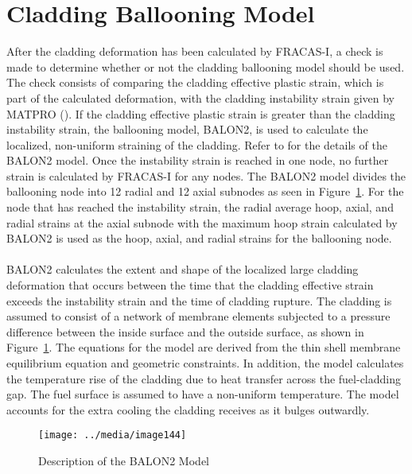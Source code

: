 \section{Cladding Ballooning Model}\label{section:cladding-ballooning-model}

After the cladding deformation has been calculated by FRACAS-I, a check is made to determine whether
or not the cladding ballooning model should be used. The check consists of comparing the cladding
effective plastic strain, which is part of the calculated deformation, with the cladding instability
strain given by MATPRO (\cite{ref:Hagrman1981a}). If the cladding effective plastic strain is greater
than the cladding instability strain, the ballooning model, BALON2, is used to calculate the
localized, non-uniform straining of the cladding. Refer to \cite{ref:Hagrman1981a} for the details of
the BALON2 model. Once the instability strain is reached in one node, no further strain is
calculated by FRACAS-I for any nodes. The BALON2 model divides the ballooning node into 12 radial
and 12 axial subnodes as seen in Figure~\ref{fig:BALON2_image}. For the node that has reached the
instability strain, the radial average hoop, axial, and radial strains at the axial subnode with the
maximum hoop strain calculated by BALON2 is used as the hoop, axial, and radial strains for the
ballooning node.  
\\
\\
BALON2 calculates the extent and shape of the localized large cladding deformation that occurs
between the time that the cladding effective strain exceeds the instability strain and the time of
cladding rupture.  The cladding is assumed to consist of a network of membrane elements subjected to
a pressure difference between the inside surface and the outside surface, as shown in
Figure~\ref{fig:BALON2_image}. The equations for the model are derived from the thin shell membrane
equilibrium equation and geometric constraints. In addition, the model calculates the temperature
rise of the cladding due to heat transfer across the fuel-cladding gap.  The fuel surface is assumed
to have a non-uniform temperature. The model accounts for the extra cooling the cladding receives as
it bulges outwardly.

\begin{figure}
    \texttt{[image: ../media/image144]}
    \caption{Description of the BALON2 Model}
    \label{fig:BALON2_image}
\end{figure}

